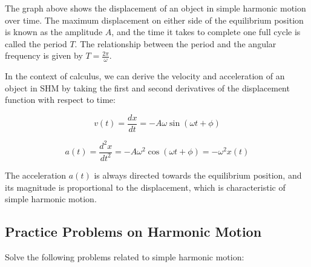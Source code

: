\documentclass[a4paper,12pt]{book}
\newcounter{problem}
\begin{document}
The graph above shows the displacement of an object in simple harmonic motion over time. The maximum displacement on either side of the equilibrium position is known as the amplitude \( A \), and the time it takes to complete one full cycle is called the period \( T \). The relationship between the period and the angular frequency is given by \( T = \frac{2\pi}{\omega} \).

In the context of calculus, we can derive the velocity and acceleration of an object in SHM by taking the first and second derivatives of the displacement function with respect to time:

\[ v(t) = \frac{dx}{dt} = -A\omega \sin(\omega t + \phi) \]

\[ a(t) = \frac{d^2x}{dt^2} = -A\omega^2 \cos(\omega t + \phi) = -\omega^2 x(t) \]

The acceleration \( a(t) \) is always directed towards the equilibrium position, and its magnitude is proportional to the displacement, which is characteristic of simple harmonic motion.

\subsection{Practice Problems on Harmonic Motion}
Solve the following problems related to simple harmonic motion:
\end{document}
